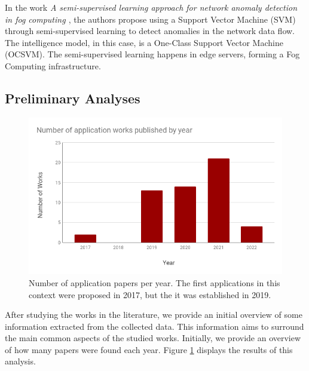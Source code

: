 
In the work \textit{A semi-supervised learning approach for network anomaly detection in fog computing \cite{xu2019semi}}, the authors propose using a Support Vector Machine (SVM) through semi-supervised learning to detect anomalies in the network data flow. The intelligence model, in this case, is a One-Class Support Vector Machine (OCSVM). The semi-supervised learning happens in edge servers, forming a Fog Computing infrastructure.


\subsection{Preliminary Analyses}

\begin{figure}[h!]
    \centering
    \includegraphics[width = .8\linewidth]{Figures/appl-year.png}
    \caption{Number of application papers per year. The first applications in this context were proposed in 2017, but the it was established in 2019.}
    \label{fig:appyear}
\end{figure}

After studying the works in the literature, we provide an initial overview of some information extracted from the collected data. This information aims to surround the main common aspects of the studied works. Initially, we provide an overview of how many papers were found each year. Figure \ref{fig:appyear} displays the results of this analysis.

